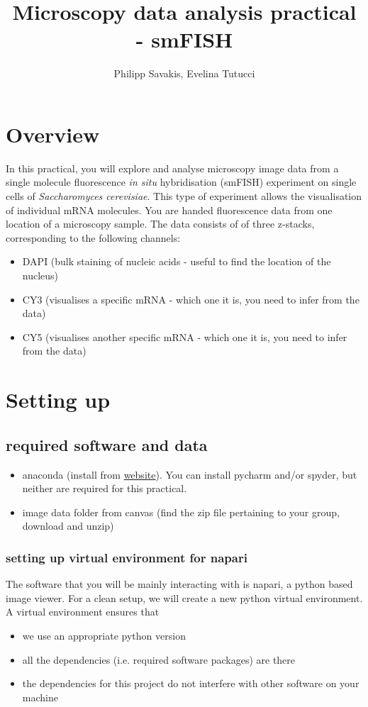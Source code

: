 \documentclass[11pt]{article} %
\title{Microscopy data analysis practical - smFISH}
\author{Philipp Savakis, Evelina Tutucci}
\begin{document}
\maketitle

\section{Overview}
In this practical, you will explore and analyse microscopy image data from a single molecule fluorescence {\it in situ} hybridisation (smFISH) experiment on single cells of {\it Saccharomyces cerevisiae}. This type of experiment allows the visualisation of individual mRNA molecules. 
You are handed fluorescence data from one location of a microscopy sample. 
The data consists of of three z-stacks, corresponding to the following channels:
\begin{itemize}
\item DAPI (bulk staining of nucleic acids - useful to find the location of the nucleus)
\item CY3 (visualises a specific mRNA - which one it is, you need to infer from the data) 
\item CY5 (visualises another specific mRNA - which one it is, you need to infer from the data)
\end{itemize}

\section{Setting up}
\subsection{required software and data}
\begin{itemize}
\item anaconda (install from \href{https://anaconda.com}{website}). You can install pycharm and/or spyder, but neither are required for this practical. 
\item image data folder from canvas (find the zip file pertaining to your group, download and unzip)
\end{itemize}

\subsubsection{setting up virtual environment for napari}
The software that you will be mainly interacting with is napari, a python based image viewer. 
For a clean setup, we will create a new python virtual environment. 
A virtual environment ensures that 
\begin{itemize}
\item we use an appropriate python version
\item all the dependencies (i.e. required software packages) are there
\item the dependencies for this project do not interfere with other software on your machine
\end{itemize}
\end{document}
